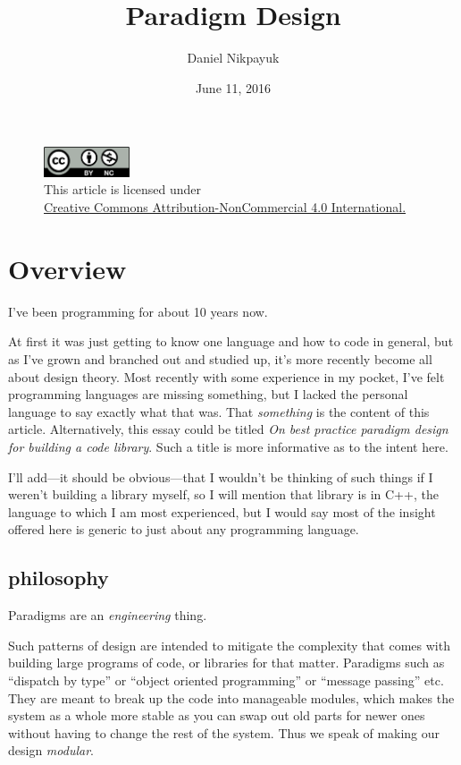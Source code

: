 \documentclass[twoside]{article}
\title{Paradigm Design}
\author{Daniel Nikpayuk}
\date{June 11, 2016}
\begin{document}
\maketitle
\thispagestyle{empty}

\begin{figure}[h]
\centering
\includegraphics[width=1in]{cc-by-nc.png}\\[0.1in]
\tiny This article is licensed under \\
\href{http://creativecommons.org/licenses/by-nc/4.0/}
{Creative Commons Attribution-NonCommercial 4.0 International.}\\[0.3in]
\end{figure}

\section*{Overview}

I've been programming for about 10 years now.

At first it was just getting to know one language and how to code in general, but as I've grown and branched out and
studied up, it's more recently become all about design theory. Most recently with some experience in my pocket,
I've felt programming languages are missing something, but I lacked the personal language to say exactly what that was.
That \emph{something} is the content of this article.  Alternatively, this essay could be titled \emph{On best
practice paradigm design for building a code library}. Such a title is more informative as to the intent here.

I'll add---it should be obvious---that I wouldn't be thinking of such things if I weren't building a library myself,
so I will mention that library is in C++, the language to which I am most experienced, but I would say most
of the insight offered here is generic to just about any programming language.

\subsection*{philosophy}

Paradigms are an \emph{engineering} thing.

Such patterns of design are intended to mitigate the complexity that comes with building large programs of code, or libraries
for that matter. Paradigms such as ``dispatch by type'' or ``object oriented programming'' or ``message passing'' etc.
They are meant to break up the code into manageable modules, which makes the system as a whole more stable as you can swap
out old parts for newer ones without having to change the rest of the system. Thus we speak of making our design \emph{modular}.
\end{document}
